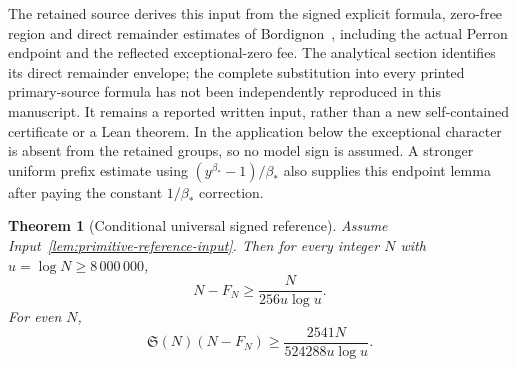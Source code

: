 \documentclass[11pt,a4paper]{article}
\newtheorem{theorem}{Theorem}[section]
\theoremstyle{definition}
\theoremstyle{remark}
\begin{document}
The retained source derives this input from the signed explicit formula,
zero-free region and direct remainder estimates of
Bordignon~\cite{Bordignon}, including the actual Perron endpoint and
the reflected exceptional-zero fee. The analytical section identifies
its direct remainder envelope; the complete substitution into every
printed primary-source formula has not been independently reproduced
in this manuscript. It remains a reported written input, rather than
a new self-contained certificate or a Lean theorem. In the
application below the exceptional character is absent from the
retained groups, so no model sign is assumed.  A stronger uniform
prefix estimate using $(y^{\beta_*}-1)/\beta_*$ also supplies this
endpoint lemma after paying the constant $1/\beta_*$ correction.

\begin{theorem}[Conditional universal signed reference]
\label{thm:universal-reference}
Assume Input~\ref{lem:primitive-reference-input}. Then for every integer
$N$ with $u=\log N\geq8\,000\,000$,
\begin{equation}
                    N-F_N\geq\frac{N}{256u\log u}.
 \label{eq:sector-universal-gap}
\end{equation}
For even $N$,
\begin{equation}
 \mathfrak S(N)(N-F_N)
                      \geq\frac{2541N}{524288u\log u}.
 \label{eq:sector-universal-singular-gap}
\end{equation}
\end{theorem}
\end{document}
